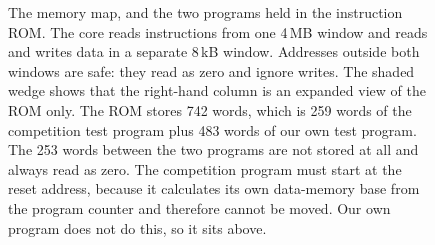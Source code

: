 \documentclass[11pt,a4paper]{article}
\begin{document}
\begin{figure}[htbp]
\begin{tikzpicture}
\end{tikzpicture}
\caption{The memory map, and the two programs held in the instruction ROM. The core reads
instructions from one 4\,MB window and reads and writes data in a separate 8\,kB window.
Addresses outside both windows are safe: they read as zero and ignore writes. The shaded
wedge shows that the right-hand column is an expanded view of the ROM only. The ROM stores
742 words, which is 259 words of the competition test program plus 483 words of our own test
program. The 253 words between the two programs are not stored at all and always read as
zero. The competition program must start at the reset address, because it calculates its own
data-memory base from the program counter and therefore cannot be moved. Our own program
does not do this, so it sits above.}
\label{fig:memmap}
\end{figure}
\end{document}
